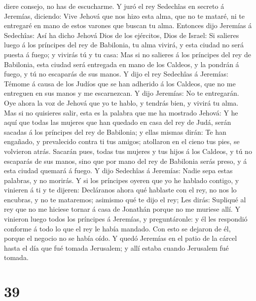 diere consejo, no has de escucharme.  Y juró el rey
Sedechîas en secreto á Jeremías, diciendo: Vive Jehová que nos hizo esta
alma, que no te mataré, ni te entregaré en mano de estos varones que
buscan tu alma.  Entonces dijo Jeremías á Sedechîas: Así ha
dicho Jehová Dios de los ejércitos, Dios de Israel: Si salieres luego á
los príncipes del rey de Babilonia, tu alma vivirá, y esta ciudad no
será puesta á fuego; y vivirás tú y tu casa:  Mas si no
salieres á los príncipes del rey de Babilonia, esta ciudad será
entregada en mano de los Caldeos, y la pondrán á fuego, y tú no
escaparás de sus manos.  Y dijo el rey Sedechîas á
Jeremías: Témome á causa de los Judíos que se han adherido á los
Caldeos, que no me entreguen en sus manos y me escarnezcan.
 Y dijo Jeremías: No te entregarán. Oye ahora la voz de
Jehová que yo te hablo, y tendrás bien, y vivirá tu alma. 
Mas si no quisieres salir, esta es la palabra que me ha mostrado Jehová:
 Y he aquí que todas las mujeres que han quedado en casa
del rey de Judá, serán sacadas á los príncipes del rey de Babilonia; y
ellas mismas dirán: Te han engañado, y prevalecido contra ti tus amigos;
atollaron en el cieno tus pies, se volvieron atrás. 
Sacarán pues, todas tus mujeres y tus hijos á los Caldeos, y tú no
escaparás de sus manos, sino que por mano del rey de Babilonia serás
preso, y á esta ciudad quemará á fuego.  Y dijo Sedechîas á
Jeremías: Nadie sepa estas palabras, y no morirás.  Y si
los príncipes oyeren que yo he hablado contigo, y vinieren á ti y te
dijeren: Decláranos ahora qué hablaste con el rey, no nos lo encubras, y
no te mataremos; asimismo qué te dijo el rey;  Les dirás:
Supliqué al rey que no me hiciese tornar á casa de Jonathán porque no me
muriese allí.  Y vinieron luego todos los príncipes á
Jeremías, y preguntáronle: y él les respondió conforme á todo lo que el
rey le había mandado. Con esto se dejaron de él, porque el negocio no se
había oído.  Y quedó Jeremías en el patio de la cárcel
hasta el día que fué tomada Jerusalem; y allí estaba cuando Jerusalem
fué tomada.

\hypertarget{section-38}{%
\section{39}\label{section-38}}

